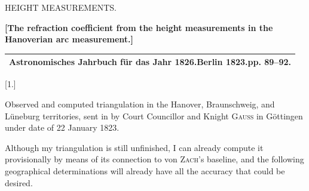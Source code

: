 

\clearpage\null\vspace*{5.7cm}
\begin{center}{\fontsize{24}{30}\selectfont HEIGHT MEASUREMENTS.}\end{center}
\par\vspace*{11.2cm}\noindent\makebox[.86\linewidth][r]{55\textsuperscript{*}}\par
\clearpage\null
\clearpage
\vspace*{1.5cm}
\begin{center}
{\large\textbf{[The refraction coefficient from the height measurements in the Hanoverian arc measurement.]}}\par\bigskip
\begin{tabular}{c}\hline
\textbf{Astronomisches Jahrbuch für das Jahr 1826.\quad Berlin 1823.\quad pp. 89--92.}\\\hline
\end{tabular}\par\bigskip
{\large [1.]}\par\medskip
{\large Observed and computed triangulation in the Hanover, Braunschweig, and Lüneburg territories, sent in by Court Councillor and Knight \textsc{Gauss} in Göttingen under date of 22 January 1823.}
\end{center}
\par\noindent\hspace*{\parindent}Although my triangulation is still unfinished, I can already compute it provisionally by means of its connection to von \textsc{Zach}'s baseline, and the following geographical determinations will already have all the accuracy that could be desired.
